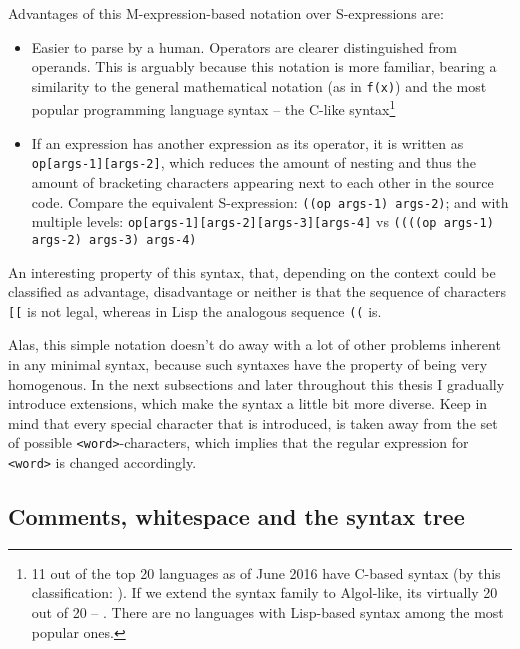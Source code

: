 Advantages of this M-expression-based notation over S-expressions are:
\begin{itemize}
    \item Easier to parse by a human. Operators are clearer distinguished from
      operands. This is arguably because this notation is more familiar, bearing
      a similarity to the general mathematical notation (as in \texttt{f(x)})
      and the most popular programming language syntax -- the C-like
      syntax\footnote{11 out of the
        top 20 languages as of June 2016\cite{tiobe} have C-based syntax (by this
        classification:
        \cite{c_family_list_wikipedia}). If
        we extend the syntax family to Algol-like, its virtually 20 out of 20 --
        \cite{pl_genealogy}. There
        are no languages with Lisp-based syntax among the most popular ones.}
    \item If an expression has another expression as its operator, it is written
      as \texttt{op[args-1][args-2]}, which reduces the amount of nesting and
      thus the amount of bracketing characters appearing next to each other in
      the source code. Compare the equivalent S-expression: \texttt{((op args-1)
        args-2)}; and with multiple levels:
      \texttt{op[args-1][args-2][args-3][args-4]} vs \texttt{((((op args-1)
        args-2) args-3) args-4)}
\end{itemize}

An interesting property of this syntax, that, depending on the context could be
classified as advantage, disadvantage or neither is that the sequence of
characters \texttt{[[} is not legal, whereas in Lisp the analogous sequence
    \texttt{((} is.

Alas, this simple notation doesn't do away with a lot of other problems inherent
in any minimal syntax, because such syntaxes have the property of being very
homogenous. In the next subsections and later throughout this thesis I gradually
introduce extensions, which make the syntax a little bit more diverse. Keep in
mind that every special character that is introduced, is taken away from the set
of possible \texttt{<word>}-characters, which implies that the regular
expression for \texttt{<word>} is changed accordingly.

\subsection{Comments, whitespace and the syntax tree}\label{sub:comments}

